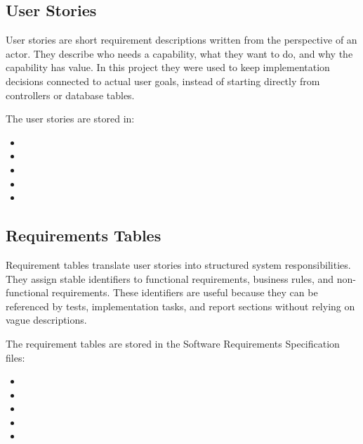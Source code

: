 \documentclass[12pt,a4paper]{article}
\begin{document}
\subsection{User Stories}

User stories are short requirement descriptions written from the perspective of an actor. They describe who needs a capability, what they want to do, and why the capability has value. In this project they were used to keep implementation decisions connected to actual user goals, instead of starting directly from controllers or database tables.

The user stories are stored in:

\begin{itemize}
    \item {}
    \item {}
    \item {}
    \item {}
    \item {}
\end{itemize}

\subsection{Requirements Tables}

Requirement tables translate user stories into structured system responsibilities. They assign stable identifiers to functional requirements, business rules, and non-functional requirements. These identifiers are useful because they can be referenced by tests, implementation tasks, and report sections without relying on vague descriptions.

The requirement tables are stored in the Software Requirements Specification files:

\begin{itemize}
    \item {}
    \item {}
    \item {}
    \item {}
    \item {}
\end{itemize}
\end{document}
